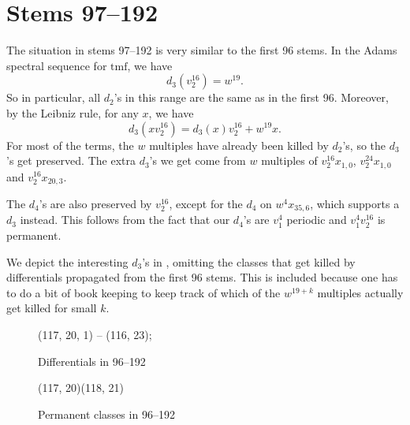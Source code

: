 \documentclass{shortart}
\newcommand\tmf{{\mathrm{tmf}}}
\begin{document}
\section{Stems 97--192}
The situation in stems 97--192 is very similar to the first 96 stems. In the Adams spectral sequence for $\tmf$, we have
\[
  d_3(v_2^{16}) = w^{19}.
\]
So in particular, all $d_2$'s in this range are the same as in the first 96. Moreover, by the Leibniz rule, for any $x$, we have
\[
  d_3(x v_2^{16}) = d_3(x) v_2^{16} + w^{19} x.
\]
For most of the terms, the $w$ multiples have already been killed by $d_2$'s, so the $d_3$'s get preserved. The extra $d_3$'s we get come from $w$ multiples of $v_2^{16} x_{1, 0}$, $v_2^{24} x_{1,0}$ and $v_2^{16} x_{20, 3}$.

The $d_4$'s are also preserved by $v_2^{16}$, except for the $d_4$ on $w^4 x_{35, 6}$, which supports a $d_3$ instead.  This follows from the fact that our $d_4$'s are $v_1^4$ periodic and $v_1^4 v_2^{16}$ is permanent.

We depict the interesting $d_3$'s in , omitting the classes that get killed by differentials propagated from the first 96 stems. This is included because one has to do a bit of book keeping to keep track of which of the $w^{19 + k}$ multiples actually get killed for small $k$.

\begin{sidewaysfigure}
  \begin{sseqpage}[name = tmf ass later, page = 3]
    (117, 20, 1) -- (116, 23);
  \end{sseqpage}
  \caption{Differentials in 96--192}\label{figure:ASS-later-diff}
\end{sidewaysfigure}

\begin{sidewaysfigure}
  \begin{sseqpage}[name = tmf ass later, page = 4]
    \structline[hone](117, 20)(118, 21)
  \end{sseqpage}
  \caption{Permanent classes in 96--192}\label{figure:ASS-later-end}
\end{sidewaysfigure}



\end{document}
